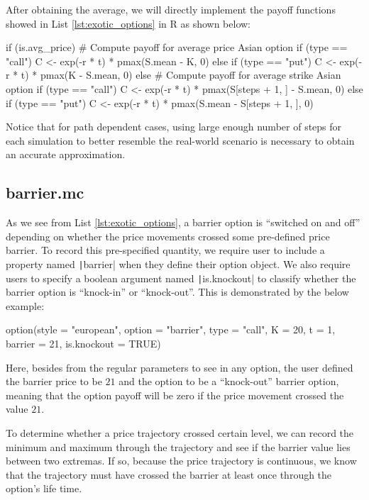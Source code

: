 After obtaining the average, we will directly implement the payoff functions showed in List \ref{lst:exotic_options} in R as shown below:

\begin{Rminted}
if (is.avg_price) { # Compute payoff for average price Asian option
    if (type == "call") {
        C <- exp(-r * t) * pmax(S.mean - K, 0)
    } else if (type == "put") {
        C <- exp(-r * t) * pmax(K - S.mean, 0)
    }
} else { # Compute payoff for average strike Asian option
    if (type == "call") {
        C <- exp(-r * t) * pmax(S[steps + 1, ] - S.mean, 0)
    } else if (type == "put") {
        C <- exp(-r * t) * pmax(S.mean - S[steps + 1, ], 0)
    }
}
\end{Rminted}

Notice that for path dependent cases, using large enough number of steps for each simulation to better resemble the real-world scenario is necessary to obtain an accurate approximation.

\subsection{barrier.mc}

As we see from List \ref{lst:exotic_options}, a barrier option is ``switched on and off'' depending on whether the price movements crossed some pre-defined price barrier. To record this pre-specified quantity, we require user to include a property named \texttt|barrier| when they define their option object. We also require users to specify a boolean argument named \texttt|is.knockout| to classify whether the barrier option is ``knock-in'' or ``knock-out''. This is demonstrated by the below example:

\begin{Rminted}
option(style = "european", option = "barrier", type = "call", K = 20, t = 1, barrier = 21, is.knockout = TRUE)
\end{Rminted}

Here, besides from the regular parameters to see in any option, the user defined the barrier price to be $21$ and the option to be a ``knock-out'' barrier option, meaning that the option payoff will be zero if the price movement crossed the value $21$.

To determine whether a price trajectory crossed certain level, we can record the minimum and maximum through the trajectory and see if the barrier value lies between two extremas. If so, because the price trajectory is continuous, we know that the trajectory must have crossed the barrier at least once through the option's life time.

